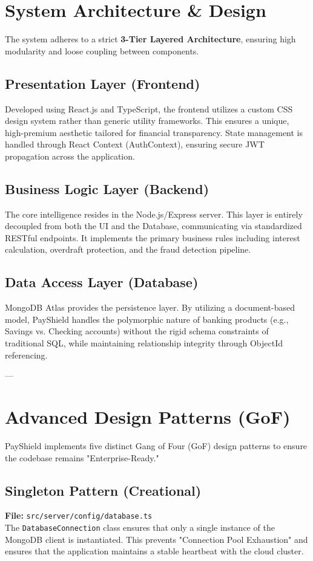 \documentclass[11pt,a4paper]{article}
\begin{document}
\section{System Architecture \& Design}
The system adheres to a strict \textbf{3-Tier Layered Architecture}, ensuring high modularity and loose coupling between components.

\subsection{Presentation Layer (Frontend)}
Developed using React.js and TypeScript, the frontend utilizes a custom CSS design system rather than generic utility frameworks. This ensures a unique, high-premium aesthetic tailored for financial transparency. State management is handled through React Context (AuthContext), ensuring secure JWT propagation across the application.

\subsection{Business Logic Layer (Backend)}
The core intelligence resides in the Node.js/Express server. This layer is entirely decoupled from both the UI and the Database, communicating via standardized RESTful endpoints. It implements the primary business rules including interest calculation, overdraft protection, and the fraud detection pipeline.

\subsection{Data Access Layer (Database)}
MongoDB Atlas provides the persistence layer. By utilizing a document-based model, PayShield handles the polymorphic nature of banking products (e.g., Savings vs. Checking accounts) without the rigid schema constraints of traditional SQL, while maintaining relationship integrity through ObjectId referencing.

---

\section{Advanced Design Patterns (GoF)}
PayShield implements five distinct Gang of Four (GoF) design patterns to ensure the codebase remains "Enterprise-Ready."

\subsection{Singleton Pattern (Creational)}
\textbf{File:} \texttt{src/server/config/database.ts} \\
The \texttt{DatabaseConnection} class ensures that only a single instance of the MongoDB client is instantiated. This prevents "Connection Pool Exhaustion" and ensures that the application maintains a stable heartbeat with the cloud cluster.
\end{document}
